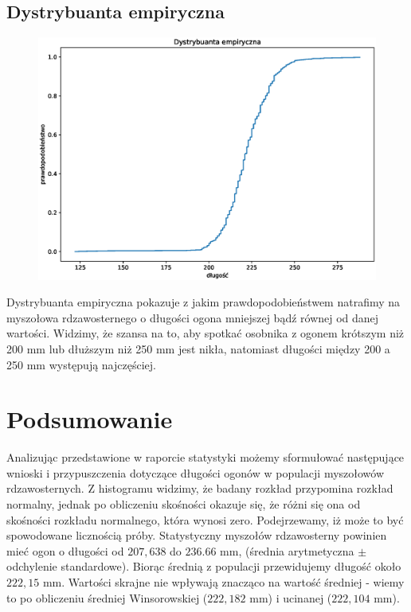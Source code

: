 \documentclass{article}
\theoremstyle{break}
\begin{document}
	\subsection{Dystrybuanta empiryczna}
	\begin{figure}[H]
		\includegraphics[scale=0.75]{DYSTRYBUANTA.eps}
	\end{figure}
Dystrybuanta empiryczna pokazuje z jakim prawdopodobieństwem natrafimy na myszołowa rdzawosternego o długości ogona mniejszej bądź równej od danej wartości. Widzimy, że szansa na to, aby spotkać osobnika z ogonem krótszym niż 200 mm lub dłuższym niż 250 mm jest nikła, natomiast długości między 200 a 250 mm występują najczęściej.
	\section{Podsumowanie}
Analizując przedstawione w raporcie statystyki możemy sformułować następujące wnioski i przypuszczenia dotyczące długości ogonów w populacji myszołowów rdzawosternych. Z histogramu widzimy, że badany rozkład przypomina rozkład normalny, jednak po obliczeniu skośności okazuje się, że różni się ona od skośności rozkładu normalnego, która wynosi zero. Podejrzewamy, iż może to być spowodowane licznością próby. Statystyczny myszołów rdzawosterny powinien mieć ogon o długości od $207,638$ do $236.66$ mm, (średnia arytmetyczna $\pm$ odchylenie standardowe). Biorąc średnią z populacji przewidujemy długość około $222,15$ mm. Wartości skrajne nie wpływają znacząco na wartość średniej - wiemy to po obliczeniu średniej Winsorowskiej ($222,182$ mm) i ucinanej ($222,104$ mm). 
	
\end{document}
